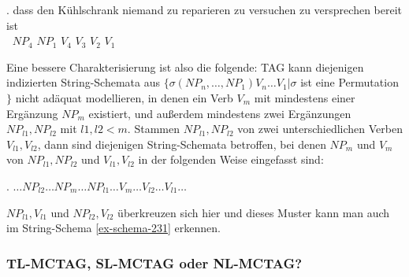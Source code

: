 \exg. dass {den Kühlschrank} niemand {zu reparieren} {zu versuchen} {zu versprechen} {bereit ist} \\
$~$ $\mathit{NP}_4$ $\mathit{NP}_1$ $V_4$ $V_3$ $V_2$ $V_1$ \\
\label{ex-schema3} 

Eine bessere Charakterisierung ist also die folgende: TAG kann diejenigen indizierten String-Schemata aus $\{ \sigma(\mathit{NP}_n, \ldots, \mathit{NP}_1) V_n \ldots V_1 | \sigma$ ist eine Permutation $\}$ nicht adäquat modellieren, in denen ein Verb $V_m$ mit mindestens einer Ergänzung $\mathit{NP}_m$ existiert, und au\ss erdem mindestens zwei Ergänzungen $\mathit{NP}_{l1}, \mathit{NP}_{l2}$ mit $l1,l2 < m$. Stammen $\mathit{NP}_{l1}, \mathit{NP}_{l2}$ von zwei unterschiedlichen Verben $V_{l1}, V_{l2}$, dann sind diejenigen String-Schemata betroffen, bei denen $\mathit{NP}_m$ und $V_m$ von $\mathit{NP}_{l1}, \mathit{NP}_{l2}$ und $V_{l1}, V_{l2}$ in der folgenden Weise eingefasst sind: 

\ex. $\ldots \mathit{NP}_{l2} \ldots \mathit{NP}_m \ldots \mathit{NP}_{l1} \ldots V_m \ldots V_{l2} \ldots V_{l1} \ldots$\label{ex-schema-abstrakt} 

$\mathit{NP}_{l1}, V_{l1}$ und $\mathit{NP}_{l2}, V_{l2}$ überkreuzen sich hier und dieses Muster kann man auch im String-Schema \ref{ex-schema-231} erkennen. 


\subsubsection*{TL-MCTAG, SL-MCTAG oder NL-MCTAG?}

